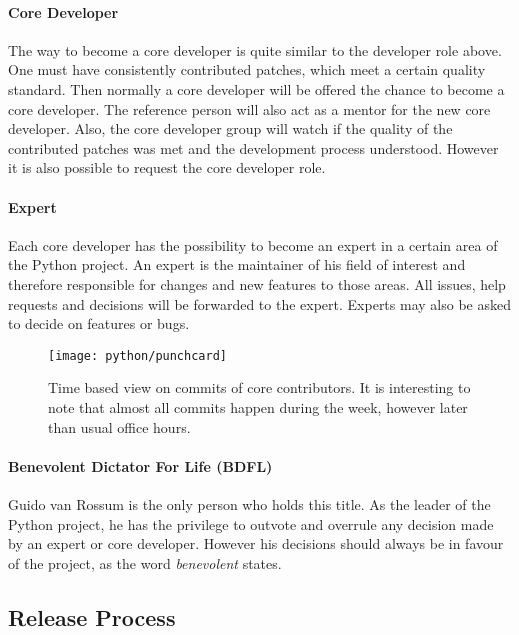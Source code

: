 \paragraph{Core Developer}

The way to become a core developer is quite similar to the developer role
above. One must have consistently contributed patches, which meet a certain
quality standard. Then normally a core developer will be offered the chance to
become a core developer. The reference person will also act as a mentor for the
new core developer. Also, the core developer group will watch if the quality of
the contributed patches was met and the development process understood. However
it is also possible to request the core developer role.

\paragraph{Expert}

Each core developer has the possibility to become an expert in a certain area
of the Python project. An expert is the maintainer of his field of interest and
therefore responsible for changes and new features to those areas. All issues,
help requests and decisions will be forwarded to the expert. Experts may also
be asked to decide on features or bugs.

\begin{figure}[hbtp]
  \centering
  \texttt{[image: python/punchcard]}
  \caption[Time Based View on Commits, Python]
  {Time based view on commits of core contributors. It is interesting to note
    that almost all commits happen during the week, however later than usual
    office hours.}
  \label{fig:python:p}
\end{figure}

\paragraph{Benevolent Dictator For Life (BDFL)}

Guido van Rossum is the only person who holds this title. As the leader of the
Python project, he has the privilege to outvote and overrule any decision made
by an expert or core developer. However his decisions should always be in
favour of the project, as the word \emph{benevolent} states.


\subsection{Release Process} %

